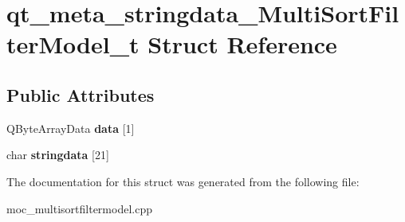 \hypertarget{structqt__meta__stringdata__MultiSortFilterModel__t}{\section{qt\-\_\-meta\-\_\-stringdata\-\_\-\-Multi\-Sort\-Filter\-Model\-\_\-t Struct Reference}
\label{structqt__meta__stringdata__MultiSortFilterModel__t}
}
\subsection*{Public Attributes}
\begin{DoxyCompactItemize}
\item 
\hypertarget{structqt__meta__stringdata__MultiSortFilterModel__t_a8050383e398bd65227864ca3c2f48196}{Q\-Byte\-Array\-Data {\bfseries data} \mbox{[}1\mbox{]}}\label{structqt__meta__stringdata__MultiSortFilterModel__t_a8050383e398bd65227864ca3c2f48196}

\item 
\hypertarget{structqt__meta__stringdata__MultiSortFilterModel__t_a395f0582b96615ce1dd9c036983c6630}{char {\bfseries stringdata} \mbox{[}21\mbox{]}}\label{structqt__meta__stringdata__MultiSortFilterModel__t_a395f0582b96615ce1dd9c036983c6630}

\end{DoxyCompactItemize}


The documentation for this struct was generated from the following file\-:\begin{DoxyCompactItemize}
\item 
moc\-\_\-multisortfiltermodel.\-cpp\end{DoxyCompactItemize}
